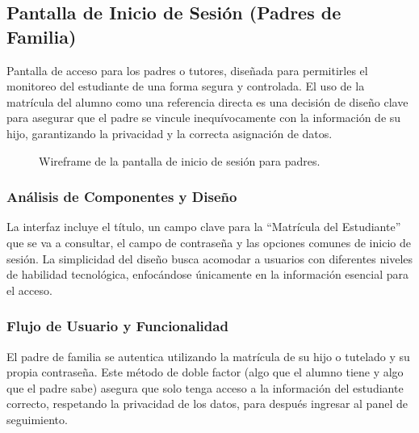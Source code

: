 \subsection{ Pantalla de Inicio de Sesión (Padres de Familia)}
\begin{samepage}\small
Pantalla de acceso para los padres o tutores, diseñada para permitirles el monitoreo del estudiante de una forma segura y controlada. El uso de la matrícula del alumno como una referencia directa es una decisión de diseño clave para asegurar que el padre se vincule inequívocamente con la información de su hijo, garantizando la privacidad y la correcta asignación de datos.
\begin{figure}[H]\centering
    \caption{Wireframe de la pantalla de inicio de sesión para padres.}\label{fig:wf-login-parents}
\end{figure}
    \subsubsection*{Análisis de Componentes y Diseño}
    La interfaz incluye el título, un campo clave para la ``Matrícula del Estudiante'' que se va a consultar, el campo de contraseña y las opciones comunes de inicio de sesión. La simplicidad del diseño busca acomodar a usuarios con diferentes niveles de habilidad tecnológica, enfocándose únicamente en la información esencial para el acceso.
    
    \subsubsection*{Flujo de Usuario y Funcionalidad}
    El padre de familia se autentica utilizando la matrícula de su hijo o tutelado y su propia contraseña. Este método de doble factor (algo que el alumno tiene y algo que el padre sabe) asegura que solo tenga acceso a la información del estudiante correcto, respetando la privacidad de los datos, para después ingresar al panel de seguimiento.
\normalsize\end{samepage}
\clearpage

